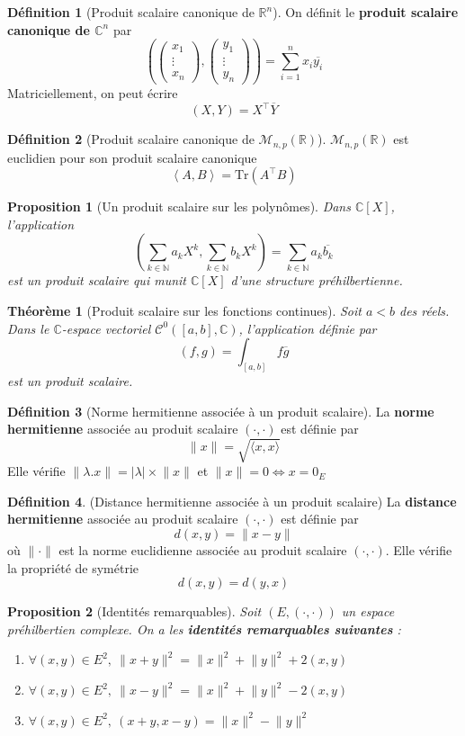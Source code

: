\documentclass[french]{article}
\newcommand{\N}{\mathbb{N}}
\newcommand{\R}{\mathbb{R}}
\newcommand{\C}{\mathbb{C}}
\newcommand{\Tr}{\text{Tr}}
\theoremstyle{plain}
\newtheorem{thm}{Théorème}
\newtheorem{prop}{Proposition}
\theoremstyle{definition}
\newtheorem{dfn}{Définition}
\begin{document}
\begin{dfn}[Produit scalaire canonique de $\R^n$]
	On définit le \textbf{produit scalaire canonique de $\C^n$} par $$\left(\begin{pmatrix}x_1 \\ \vdots \\ x_n\end{pmatrix}, \begin{pmatrix}y_1 \\ \vdots \\ y_n\end{pmatrix}\right)=\sum_{i=1}^{n}x_i\overline{y_i}$$ Matriciellement, on peut écrire $$(X,Y)=X^\top \overline{Y}$$
\end{dfn}
\begin{dfn}[Produit scalaire canonique de $\mathcal{M}_{n,p}(\R)$]
	$\mathcal{M}_{n,p}(\R)$ est euclidien pour son produit scalaire canonique $$\left\langle A,B\right\rangle =\Tr(A^\top B)$$
\end{dfn}
\begin{prop}[Un produit scalaire sur les polynômes]
	Dans $\C[X]$, l'application $$\left(\sum_{k\in\N}a_kX^k,\sum_{k\in\N}b_kX^k\right) = \sum_{k\in\N}a_k\overline{b_k}$$ est un produit scalaire qui munit $\C[X]$ d'une structure préhilbertienne.
\end{prop}
\begin{thm}[Produit scalaire sur les fonctions continues]
	Soit $a<b$ des réels. Dans le $\C$-espace vectoriel $\mathcal{C}^0([a,b],\C)$, l'application définie par $$(f,g) = \int_{[a,b]} f\overline{g}$$ est un produit scalaire.
\end{thm}
\begin{dfn}[Norme hermitienne associée à un produit scalaire]
	La \textbf{norme hermitienne} associée au produit scalaire $(\cdot,\cdot)$ est définie par $$\lVert x\rVert=\sqrt{\langle x,x\rangle}$$ Elle vérifie $\lVert \lambda.x\rVert=\lvert\lambda\rvert\times\lVert x\rVert$ et $\lVert x\rVert =0 \iff x=0_E$
\end{dfn}
\begin{dfn}(Distance hermitienne associée à un produit scalaire)
	La \textbf{distance hermitienne} associée au produit scalaire $(\cdot,\cdot)$ est définie par $$d(x,y)=\lVert x-y\rVert$$ où $\lVert\cdot\rVert$ est la norme euclidienne associée au produit scalaire $(\cdot,\cdot)$. Elle vérifie la propriété de symétrie $$d(x,y)=d(y,x)$$
\end{dfn}
\begin{prop}[Identités remarquables]
	Soit $(E,(\cdot,\cdot))$ un espace préhilbertien complexe. On a les \textbf{identités remarquables suivantes} :
	\begin{enumerate}
		\item $\forall (x,y)\in E^2,\ \lVert x+y\rVert^2=\lVert x\rVert^2+\lVert y\rVert^2+2(x,y)$
		\item $\forall (x,y)\in E^2,\ \lVert x-y\rVert^2=\lVert x\rVert^2+\lVert y\rVert^2-2(x,y)$
		\item $\forall (x,y)\in E^2,\ (x+y,x-y)=\lVert x\rVert^2-\lVert y\rVert^2$
	\end{enumerate}
\end{prop}
\end{document}
